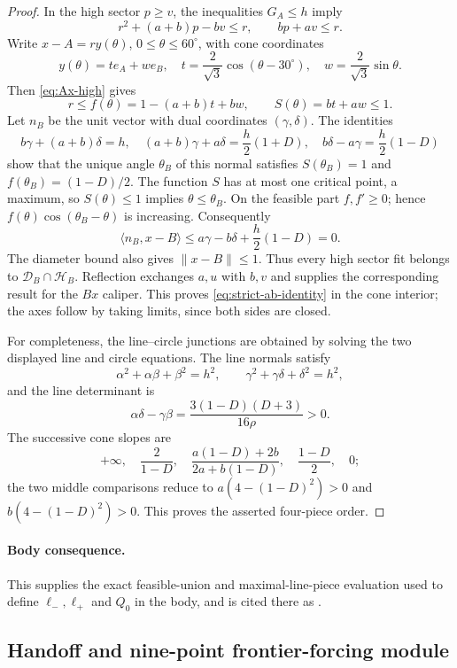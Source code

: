 \begin{proof}
In the high sector $p\ge v$, the inequalities $G_A\le h$ imply
\begin{equation}
 r^2+(a+b)p-bv\le r,\qquad bp+av\le r.          \label{eq:Ax-high}
\end{equation}
Write $x-A=ry(\theta)$, $0\le\theta\le60^\circ$, with cone coordinates
\[
 y(\theta)=te_A+we_B,\quad
 t=\frac2{\sqrt3}\cos(\theta-30^\circ),\quad
 w=\frac2{\sqrt3}\sin\theta.
\]
Then \eqref{eq:Ax-high} gives
\[
 r\le f(\theta)=1-(a+b)t+bw,\qquad S(\theta)=bt+aw\le1.
\]
Let $n_B$ be the unit vector with dual coordinates $(\gamma,\delta)$.
The identities
\[
 b\gamma+(a+b)\delta=h,\quad
 (a+b)\gamma+a\delta=\frac h2(1+D),\quad
 b\delta-a\gamma=\frac h2(1-D)
\]
show that the unique angle $\theta_B$ of this normal satisfies
$S(\theta_B)=1$ and $f(\theta_B)=(1-D)/2$.  The function $S$ has at most
one critical point, a maximum, so $S(\theta)\le1$ implies
$\theta\le\theta_B$.  On the feasible part $f,f'\ge0$; hence
$f(\theta)\cos(\theta_B-\theta)$ is increasing.  Consequently
\[
 \langle n_B,x-B\rangle
 \le a\gamma-b\delta+\frac h2(1-D)=0.
\]
The diameter bound also gives $\lVert x-B\rVert\le1$.  Thus every high
sector fit belongs to $\mathcal D_B\cap\mathcal H_B$.  Reflection exchanges
$a,u$ with $b,v$ and supplies the corresponding result for the $Bx$
caliper.  This proves \eqref{eq:strict-ab-identity} in the cone interior;
the axes follow by taking limits, since both sides are closed.

For completeness, the line--circle junctions are obtained by solving the
two displayed line and circle equations.  The line normals satisfy
\[
 \alpha^2+\alpha\beta+\beta^2=h^2,\qquad
 \gamma^2+\gamma\delta+\delta^2=h^2,
\]
and the line determinant is
\[
 \alpha\delta-\gamma\beta
 =\frac{3(1-D)(D+3)}{16\rho}>0.
\]
The successive cone slopes are
\[
 +\infty,\quad \frac2{1-D},\quad
 \frac{a(1-D)+2b}{2a+b(1-D)},\quad
 \frac{1-D}{2},\quad0;
\]
the two middle comparisons reduce to
$a(4-(1-D)^2)>0$ and $b(4-(1-D)^2)>0$.  This proves the asserted four-piece
order.
\end{proof}

\paragraph{Body consequence.}
This supplies the exact feasible-union and maximal-line-piece evaluation used
to define $\ell_-,\ell_+$ and $Q_0$ in the body, and is cited there as
.

\subsection{Handoff and nine-point frontier-forcing module}

